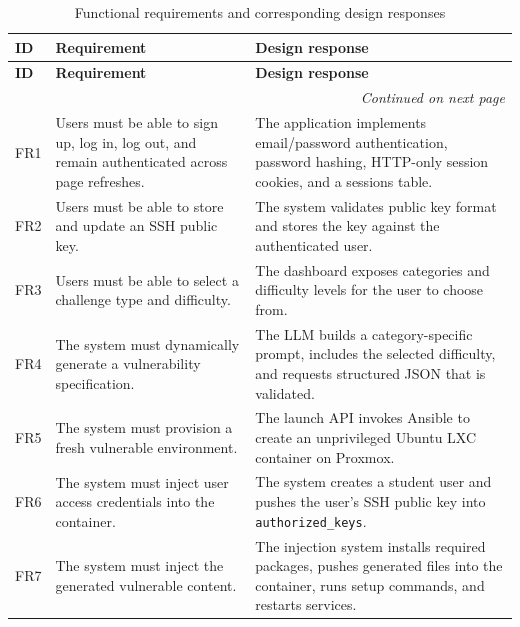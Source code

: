 \begin{longtable}{@{}p{} p{} p{}@{}}
\caption{Functional requirements and corresponding design responses}
\label{tab:functional-requirements-long}\\

\toprule
\textbf{ID} & \textbf{Requirement} & \textbf{Design response} \\
\midrule
\endfirsthead

\toprule
\textbf{ID} & \textbf{Requirement} & \textbf{Design response} \\
\midrule
\endhead

\midrule
\multicolumn{3}{r}{\emph{Continued on next page}} \\
\endfoot

\bottomrule
\endlastfoot

FR1 &
Users must be able to sign up, log in, log out, and remain authenticated across page refreshes. &
The application implements email/password authentication, password hashing, HTTP-only session cookies, and a sessions table. \\

FR2 &
Users must be able to store and update an SSH public key. &
The system validates public key format and stores the key against the authenticated user. \\

FR3 &
Users must be able to select a challenge type and difficulty. &
The dashboard exposes categories and difficulty levels for the user to choose from. \\

FR4 &
The system must dynamically generate a vulnerability specification. &
The LLM builds a category-specific prompt, includes the selected difficulty, and requests structured JSON that is validated. \\

FR5 &
The system must provision a fresh vulnerable environment. &
The launch API invokes Ansible to create an unprivileged Ubuntu LXC container on Proxmox. \\

FR6 &
The system must inject user access credentials into the container. &
The system creates a student user and pushes the user's SSH public key into \texttt{authorized\_keys}. \\

FR7 &
The system must inject the generated vulnerable content. &
The injection system installs required packages, pushes generated files into the container, runs setup commands, and restarts services. \\


\end{longtable}
